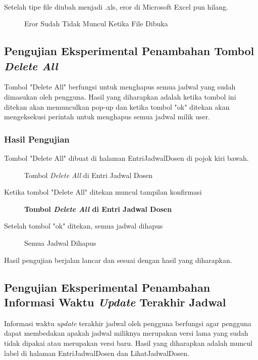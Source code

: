 \paragraph{}Setelah tipe file diubah menjadi  .xls, eror di Microsoft Excel pun hilang.
\begin{figure} [H]
	\centering  
	\caption[Eror Sudah Tidak Muncul Ketika File Dibuka]{Eror Sudah Tidak Muncul Ketika File Dibuka} 
	\label{fig:eror-hilang} 
\end{figure}

\subsection{Pengujian Eksperimental Penambahan Tombol \textit{Delete All}}
Tombol "Delete All" berfungsi untuk menghapus semua jadwal yang sudah dimasukan oleh pengguna. Hasil yang diharapkan adalah ketika tombol ini ditekan akan memunculkan pop-up dan ketika tombol "ok" ditekan akan mengeksekusi perintah untuk menghapus semua jadwal milik user.
\subsubsection{Hasil Pengujian}
Tombol "Delete All" dibuat di halaman EntriJadwalDosen di pojok kiri bawah.
\begin{figure} [H]
	\centering  
	\caption[Tombol \textit{Delete All} di Entri Jadwal Dosen]{Tombol \textit{Delete All} di Entri Jadwal Dosen} 
	\label{fig:flow-chart-CodeIgniter} 
\end{figure}
Ketika tombol "Delete All" ditekan muncul tampilan konfirmasi
\begin{figure} [H]
	\centering  
	\caption[Tampilan Konfirmasi]{\textbf{Tombol \textit{Delete All} di Entri Jadwal Dosen}} 
	\label{fig:flow-chart-CodeIgniter} 
\end{figure}
Setelah tombol "ok" ditekan, semua jadwal dihapus
\begin{figure} [H]
	\centering  
	\caption[Semua Jadwal Dihapus]{Semua Jadwal Dihapus} 
	\label{fig:flow-chart-CodeIgniter} 
\end{figure}
Hasil pengujian berjalan lancar dan sesuai dengan hasil yang diharapkan.

\subsection{Pengujian Eksperimental Penambahan Informasi Waktu \textit{Update} Terakhir Jadwal}
Informasi waktu \textit{update} terakhir jadwal oleh pengguna berfungsi agar pengguna dapat membedakan apakah jadwal miliknya merupakan versi lama yang sudah tidak dipakai atau merupakan versi baru. Hasil yang diharapkan adalah muncul label di halaman EntriJadwalDosen dan LihatJadwalDosen.
